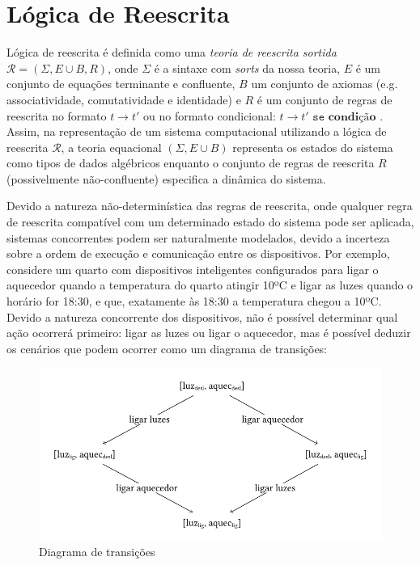 \section{Lógica de Reescrita} \label{sec:chap2}

Lógica de reescrita é definida como uma \textit{teoria de reescrita sortida} $\mathcal{R} = (\Sigma, E \cup B, R)$, onde $\Sigma$ é a sintaxe com \emph{sorts} da nossa teoria, $E$ é um conjunto de equações terminante e confluente, $B$ um conjunto de axiomas (e.g. associatividade, comutatividade e identidade) e $R$ é um conjunto de regras de reescrita no formato $t \rightarrow t'$ ou no formato condicional: $t \rightarrow t' \texttt{ se } \textbf{condição}$ \cite{RewritingLogicTwentyYears}. Assim, na representação de um sistema computacional utilizando a lógica de reescrita $\mathcal{R}$, a teoria equacional $(\Sigma, E \cup B)$ representa os estados do sistema como tipos de dados algébricos enquanto o conjunto de regras de reescrita $R$ (possivelmente não-confluente) especifica a dinâmica do sistema.


Devido a natureza não-determinística das regras de reescrita, onde qualquer regra de reescrita compatível com um determinado estado do sistema pode ser aplicada, sistemas concorrentes podem ser naturalmente modelados, devido a incerteza sobre a ordem de execução e comunicação entre os dispositivos. 
Por exemplo, considere um quarto com dispositivos inteligentes configurados para ligar o aquecedor quando a temperatura do quarto atingir 10ºC e ligar as luzes quando o horário for 18:30, e que, exatamente às 18:30 a temperatura chegou a 10ºC. Devido a natureza concorrente dos dispositivos, não é possível determinar qual ação ocorrerá primeiro: ligar as luzes ou ligar o aquecedor, mas é possível deduzir os cenários que podem ocorrer como um diagrama de transições:


\begin{figure}[h]
  \centering
  \includegraphics{img/diagram.pdf}
  \caption{Diagrama de transições}
  \label{fig:fig1}
\end{figure}

